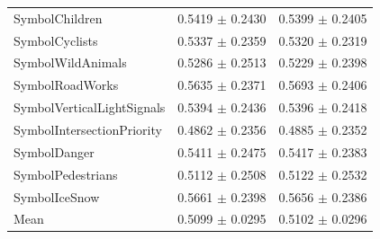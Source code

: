 \begin{longtable}{@{}lrr@{}}
SymbolChildren & 0.5419 $\pm$ 0.2430 & 0.5399 $\pm$ 0.2405 \\
SymbolCyclists & 0.5337 $\pm$ 0.2359 & 0.5320 $\pm$ 0.2319 \\
SymbolWildAnimals & 0.5286 $\pm$ 0.2513 & 0.5229 $\pm$ 0.2398 \\
SymbolRoadWorks & 0.5635 $\pm$ 0.2371 & 0.5693 $\pm$ 0.2406 \\
SymbolVerticalLightSignals & 0.5394 $\pm$ 0.2436 & 0.5396 $\pm$ 0.2418 \\
SymbolIntersectionPriority & 0.4862 $\pm$ 0.2356 & 0.4885 $\pm$ 0.2352 \\
SymbolDanger & 0.5411 $\pm$ 0.2475 & 0.5417 $\pm$ 0.2383 \\
SymbolPedestrians & 0.5112 $\pm$ 0.2508 & 0.5122 $\pm$ 0.2532 \\
SymbolIceSnow & 0.5661 $\pm$ 0.2398 & 0.5656 $\pm$ 0.2386 \\
Mean & 0.5099 $\pm$ 0.0295 & 0.5102 $\pm$ 0.0296 \\
\end{longtable}
